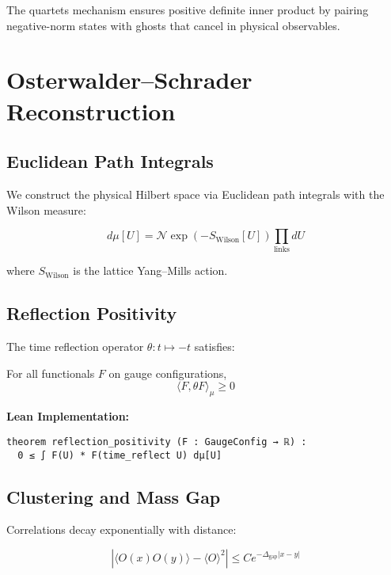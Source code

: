 \documentclass[11pt]{amsart}
\newcommand{\massGap}{\Delta_{\text{gap}}}
\begin{document}
The quartets mechanism ensures positive definite inner product by pairing negative-norm states with ghosts that cancel in physical observables.

\section{Osterwalder--Schrader Reconstruction}

\subsection{Euclidean Path Integrals}

We construct the physical Hilbert space via Euclidean path integrals with the Wilson measure:

\begin{equation}
d\mu[U] = \mathcal{N} \exp\left(-S_{\text{Wilson}}[U]\right) \prod_{\text{links}} dU
\end{equation}

where $S_{\text{Wilson}}$ is the lattice Yang--Mills action.

\subsection{Reflection Positivity}

The time reflection operator $\theta: t \mapsto -t$ satisfies:

\begin{theorem}
For all functionals $F$ on gauge configurations,
\begin{equation}
\langle F, \theta F \rangle_{\mu} \geq 0
\end{equation}
\end{theorem}

\textbf{Lean Implementation:}
\begin{lstlisting}
theorem reflection_positivity (F : GaugeConfig → ℝ) :
  0 ≤ ∫ F(U) * F(time_reflect U) dμ[U]
\end{lstlisting}

\subsection{Clustering and Mass Gap}

Correlations decay exponentially with distance:

\begin{equation}
|\langle O(x) O(y) \rangle - \langle O \rangle^2| \leq C e^{-\massGap |x-y|}
\end{equation}
\end{document}

